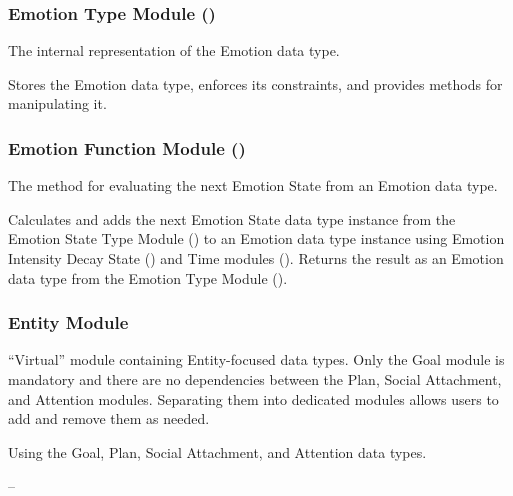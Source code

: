 \subsubsection{Emotion Type Module ()}

\begin{description}[font=\scshape]
    \item[Secrets:] The internal representation of the Emotion data type.

    \item[Services:] Stores the Emotion data type, enforces its constraints,
    and provides methods for manipulating it.

    \item[Implemented By:] \progname{}
\end{description}

\subsubsection{Emotion Function Module ()}

\begin{description}[font=\scshape]
    \item[Secrets:] The method for evaluating the next Emotion State from an
    Emotion data type.

    \item[Services:] Calculates and adds the next Emotion State data type
    instance from the Emotion State Type Module () to an
    Emotion data type instance using Emotion Intensity Decay State
    () and Time modules (). Returns the result as
    an Emotion data type from the Emotion Type Module ().

    \item[Implemented By:] \progname{}
\end{description}

\subsubsection{Entity Module}

\begin{description}[font=\scshape]
    \item[Secrets:] ``Virtual'' module containing Entity-focused data types.
    Only the Goal module is mandatory and there are no dependencies between the
    Plan, Social Attachment, and Attention modules. Separating them into
    dedicated modules allows users to add and remove them as needed.

    \item[Services:] Using the Goal, Plan, Social Attachment, and Attention
    data types.

    \item[Implemented By:] --
\end{description}

